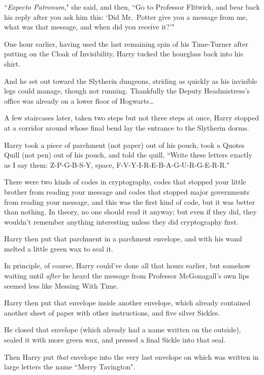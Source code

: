 ``\emph{Expecto Patronum}," she said, and then, ``Go to Professor Flitwick, and bear back his reply after you ask him this: `Did Mr.~Potter give you a message from me, what was that message, and when did you receive it?'"

\later

One hour earlier, having used the last remaining spin of his Time-Turner after putting on the Cloak of Invisibility, Harry tucked the hourglass back into his shirt.

And he set out toward the Slytherin dungeons, striding as quickly as his invisible legs could manage, though not running. Thankfully the Deputy Headmistress's office was already on a lower floor of Hogwarts{\ldots}

A few staircases later, taken two steps but not three steps at once, Harry stopped at a corridor around whose final bend lay the entrance to the Slytherin dorms.

Harry took a piece of parchment (not paper) out of his pouch, took a Quotes Quill (not pen) out of his pouch, and told the quill, ``Write these letters exactly as I say them: Z-P-G-B-S-Y, space, F-V-Y-I-R-E-B-A-G-U-R-G-E-R-R."

There were two kinds of codes in cryptography, codes that stopped your little brother from reading your message and codes that stopped major governments from reading your message, and this was the first kind of code, but it was better than nothing. In theory, no one should read it anyway; but even if they did, they wouldn't remember anything interesting unless they did cryptography first.

Harry then put that parchment in a parchment envelope, and with his wand melted a little green wax to seal it.

In principle, of course, Harry could've done all that hours earlier, but somehow waiting until \emph{after} he heard the message from Professor McGonagall's own lips seemed less like Messing With Time.

Harry then put that envelope inside another envelope, which already contained another sheet of paper with other instructions, and five silver Sickles.

He closed that envelope (which already had a name written on the outside), sealed it with more green wax, and pressed a final Sickle into that seal.

Then Harry put \emph{that} envelope into the very last envelope on which was written in large letters the name ``Merry Tavington".


